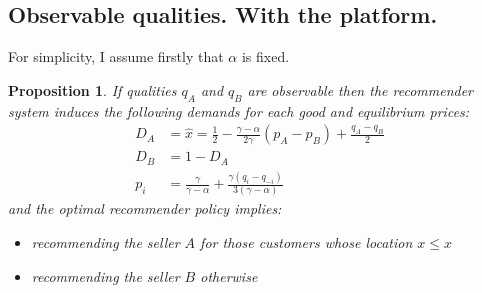 \documentclass[a4paper]{article}
\newtheorem{proposition}[theorem]{Proposition}
\begin{document}
	\subsection{Observable qualities. With the platform.}
	For simplicity, I assume firstly that $\alpha$ is fixed.
	\begin{proposition} \label{with}
		If qualities $q_A$ and $q_B$ are observable then the recommender system induces the following demands for each good and equilibrium prices:
		\begin{align*}
		D_A &= \hat{x} = \frac{1}{2} - \frac{\gamma-\alpha}{2 \gamma}(p_A - p_B) + \frac{q_A - q_B}{2}\\
		D_B &= 1 - D_A\\
		p_i &= \frac{\gamma}{\gamma - \alpha} + \frac{\gamma(q_{i} -q_{-i})}{3(\gamma-\alpha)}
		\end{align*}
		and the optimal recommender policy implies:
		\begin{itemize}
			\item recommending the seller $A$ for those customers whose location $x \le \hat{x}$
			\item recommending the seller $B$ otherwise
		\end{itemize}
	\end{proposition}
\end{document}
